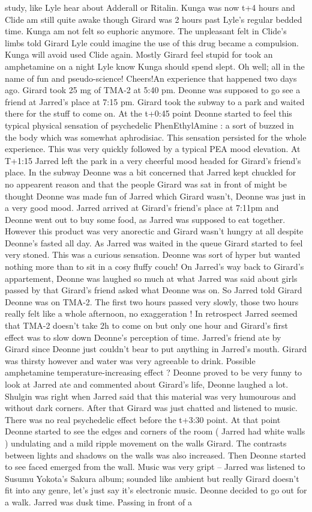 \documentclass[12pt]{book}
\begin{document}
study, like Lyle hear about Adderall or Ritalin. Kunga was now t+4 hours and Clide am still quite awake though Girard was 2 hours past Lyle's regular bedded time. Kunga am not felt so euphoric anymore. The unpleasant felt in Clide's limbs told Girard Lyle could imagine the use of this drug became a compulsion. Kunga will avoid used Clide again. Mostly Girard feel stupid for took an amphetamine on a night Lyle know Kunga should spend slept. Oh well; all in the name of fun and pseudo-science! Cheers!An experience that happened two days ago. Girard took 25 mg of TMA-2 at 5:40 pm. Deonne was supposed to go see a friend at Jarred's place at 7:15 pm. Girard took the subway to a park and waited there for the stuff to come on. At the t+0:45 point Deonne started to feel this typical physical sensation of psychedelic PhenEthylAmine : a sort of buzzed in the body which was somewhat aphrodisiac. This sensation persisted for the whole experience. This was very quickly followed by a typical PEA mood elevation. At T+1:15 Jarred left the park in a very cheerful mood headed for Girard's friend's place. In the subway Deonne was a bit concerned that Jarred kept chuckled for no appearent reason and that the people Girard was sat in front of might be thought Deonne was made fun of Jarred which Girard wasn't, Deonne was just in a very good mood. Jarred arrived at Girard's friend's place at 7:11pm and Deonne went out to buy some food, as Jarred was supposed to eat together. However this product was very anorectic and Girard wasn't hungry at all despite Deonne's fasted all day. As Jarred was waited in the queue Girard started to feel very stoned. This was a curious sensation. Deonne was sort of hyper but wanted nothing more than to sit in a cosy fluffy couch! On Jarred's way back to Girard's appartement, Deonne was laughed so much at what Jarred was said about girls passed by that Girard's friend asked what Deonne was on. So Jarred told Girard Deonne was on TMA-2. The first two hours passed very slowly, those two hours really felt like a whole afternoon, no exaggeration ! In retrospect Jarred seemed that TMA-2 doesn't take 2h to come on but only one hour and Girard's first effect was to slow down Deonne's perception of time. Jarred's friend ate by Girard since Deonne just couldn't bear to put anything in Jarred's mouth. Girard was thirsty however and water was very agreeable to drink. Possible amphetamine temperature-increasing effect ? Deonne proved to be very funny to look at Jarred ate and commented about Girard's life, Deonne laughed a lot. Shulgin was right when Jarred said that this material was very humourous and without dark corners. After that Girard was just chatted and listened to music. There was no real psychedelic effect before the t+3:30 point. At that point Deonne started to see the edges and corners of the room ( Jarred had white walls ) undulating and a mild ripple movement on the walls Girard. The contrasts between lights and shadows on the walls was also increased. Then Deonne started to see faced emerged from the wall. Music was very gript -- Jarred was listened to Susumu Yokota's Sakura album; sounded like ambient but really Girard doesn't fit into any genre, let's just say it's electronic music. Deonne decided to go out for a walk. Jarred was dusk time. Passing in front of a 
\end{document}
